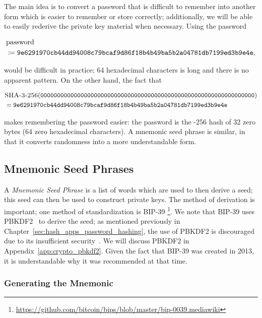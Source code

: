 The main idea is to convert a password that is difficult to remember
into another form which is easier to remember
or store correctly;
additionally, we will be able to easily rederive the private key material
when necessary.
Using the password

\begin{align}
    &\text{password} \nonumber\\
    &\coloneqq{}
    \texttt{9e6291970cb44dd94008c79bcaf9d86f18b4b49ba5b2a04781db7199ed3b9e4e},
\end{align}

\noindent
would be difficult in practice;
64 hexadecimal characters is long and there is no apparent pattern.
On the other hand, the fact that

\begin{align}
    &\textsc{\ShaThree{}-256}(
    \texttt{0000000000000000000000000000000000000000000000000000000000000000})
    \nonumber\\
    &= 
    \texttt{9e6291970cb44dd94008c79bcaf9d86f18b4b49ba5b2a04781db7199ed3b9e4e}
\end{align}

\noindent
makes remembering the password easier:
the password is the \textsc{\ShaThree{}-256} hash of 32 zero bytes
(64 zero hexadecimal characters).
A mnemonic seed phrase is similar, in that it converts
randomness into a more understandable form.

\subsection{Mnemonic Seed Phrases}

A \emph{Mnemonic Seed Phrase} is a list of words which are used to then
derive a seed;
this seed can then be used to construct private keys.
The method of derivation is important;
one method of standardization is BIP-39%
\footnote{\url{https://github.com/bitcoin/bips/blob/master/bip-0039.mediawiki}}.
We note that BIP-39 uses PBKDF2~\cite{rfc8018} to derive the seed;
as mentioned previously in Chapter~\ref{sec:hash_apps_password_hashing},
the use of PBKDF2 is discouraged due to its insufficient
security~\cite{blocki2018economics}.
We will discuss PBKDF2 in Appendix~\ref{app:crypto_pbkdf2}.
Given the fact that BIP-39 was created in 2013, it is understandable
why it was recommended at that time.

\subsubsection{Generating the Mnemonic}


